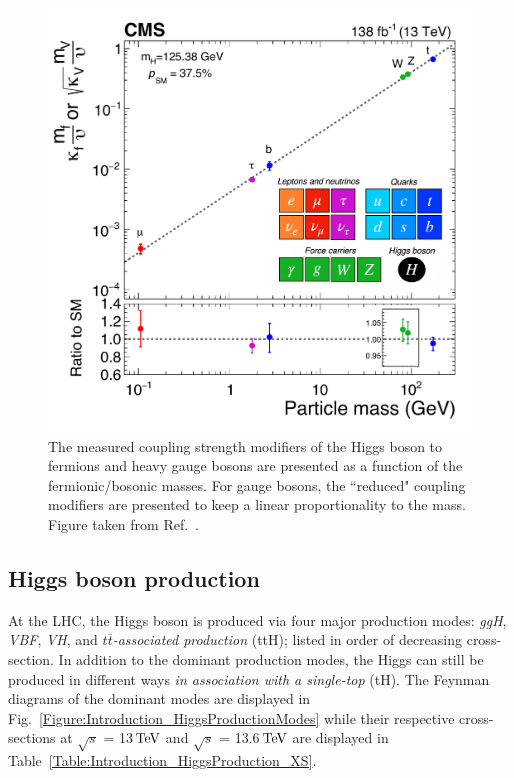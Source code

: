 \begin{figure}[!htbp]
\centering
\includegraphics[width= .7\textwidth]{Figures/Introduction/CMS_Higgs_FermionCouplings.pdf}
\caption[Measured Higgs coupling modifiers versus fermion and boson masses]{The measured coupling strength modifiers of the Higgs boson to fermions and heavy gauge bosons are presented as a function of the fermionic/bosonic masses. For gauge bosons, the ``reduced" coupling modifiers are presented to keep a linear proportionality to the mass. Figure taken from Ref.~\cite{CMS_Couplings_Measurement}.}
\label{Figure:Introduction_CMScouplings}
\end{figure}

\subsection{Higgs boson production}

At the \ac{LHC}, the Higgs boson is produced via four major production modes: \textit{\ac{ggH}}, \textit{\ac{VBF}}, \textit{\ac{VH}}, and \textit{$t\overline{t}$-associated production} (ttH); listed in order of decreasing cross-section. In addition to the dominant production modes, the Higgs can still be produced in different ways \eg \textit{in association with a single-top} (tH). The Feynman diagrams of the dominant modes are displayed in Fig.~\ref{Figure:Introduction_HiggsProductionModes} while their respective cross-sections at $\sqrt{s}$ = 13$\,\text{Te\hspace{-.08em}V}$ and $\sqrt{s}$ = 13.6$\,\text{Te\hspace{-.08em}V}$ are displayed in Table~\ref{Table:Introduction_HiggsProduction_XS}. 


